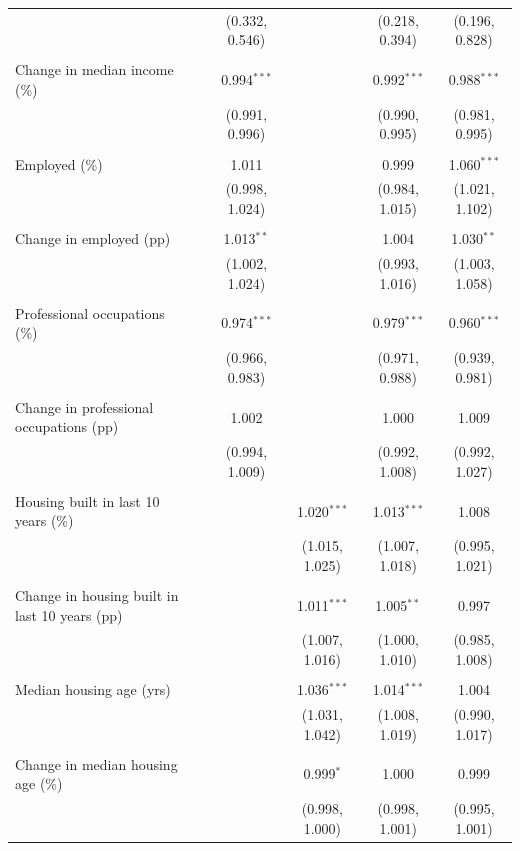 \documentclass[]{article}
\begin{document}
\begin{landscape}
\begin{longtable}[c]{@{}lccccc@{}}
  &  & (0.332, 0.546) &  & (0.218, 0.394) & (0.196, 0.828) \\ 
  & & & & & \\ 
 Change in median income (\%) &  & 0.994$^{***}$ &  & 0.992$^{***}$ & 0.988$^{***}$ \\ 
  &  & (0.991, 0.996) &  & (0.990, 0.995) & (0.981, 0.995) \\ 
  & & & & & \\ 
 Employed (\%) &  & 1.011 &  & 0.999 & 1.060$^{***}$ \\ 
  &  & (0.998, 1.024) &  & (0.984, 1.015) & (1.021, 1.102) \\ 
  & & & & & \\ 
 Change in employed (pp) &  & 1.013$^{**}$ &  & 1.004 & 1.030$^{**}$ \\ 
  &  & (1.002, 1.024) &  & (0.993, 1.016) & (1.003, 1.058) \\ 
  & & & & & \\ 
 Professional occupations (\%) &  & 0.974$^{***}$ &  & 0.979$^{***}$ & 0.960$^{***}$ \\ 
  &  & (0.966, 0.983) &  & (0.971, 0.988) & (0.939, 0.981) \\ 
  & & & & & \\ 
 Change in professional occupations (pp) &  & 1.002 &  & 1.000 & 1.009 \\ 
  &  & (0.994, 1.009) &  & (0.992, 1.008) & (0.992, 1.027) \\ 
  & & & & & \\ 
 Housing built in last 10 years (\%) &  &  & 1.020$^{***}$ & 1.013$^{***}$ & 1.008 \\ 
  &  &  & (1.015, 1.025) & (1.007, 1.018) & (0.995, 1.021) \\ 
  & & & & & \\ 
 Change in housing built in last 10 years (pp) &  &  & 1.011$^{***}$ & 1.005$^{**}$ & 0.997 \\ 
  &  &  & (1.007, 1.016) & (1.000, 1.010) & (0.985, 1.008) \\ 
  & & & & & \\ 
 Median housing age (yrs) &  &  & 1.036$^{***}$ & 1.014$^{***}$ & 1.004 \\ 
  &  &  & (1.031, 1.042) & (1.008, 1.019) & (0.990, 1.017) \\ 
  & & & & & \\ 
 Change in median housing age (\%) &  &  & 0.999$^{*}$ & 1.000 & 0.999 \\ 
  &  &  & (0.998, 1.000) & (0.998, 1.001) & (0.995, 1.001) \\ 

\end{longtable}
\end{landscape}
\end{document}
